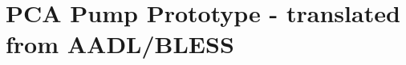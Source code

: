 
\cleardoublepage

\chapter{PCA Pump Prototype - translated from AADL/BLESS}
\label{Appendix:PPP_Trahslated}

